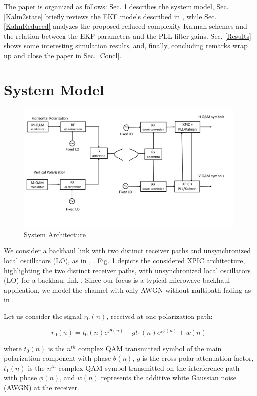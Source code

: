 The paper is organized as follows: Sec. \ref{SM} describes the system model, Sec. \ref{Kalm2state} briefly reviews the EKF models described in \cite{CommLett}, while Sec. \ref{KalmReduced} analyzes the proposed reduced complexity Kalman schemes and the relation between the EKF parameters and the PLL filter gains. 
Sec. \ref{Results} shows some interesting simulation results, and, finally, concluding remarks wrap up and close the paper in Sec. \ref{Concl}.

\section{System Model}
\label{SM}

\begin{figure}
	\centering
	\includegraphics[width=1\textwidth]{figures/fig_red_kalman/Fig1.pdf}
	\caption{System Architecture}
	\label{Fig1}
\end{figure}


We consider a backhaul link with two distinct receiver paths and unsynchronized local oscillators (LO), as in \cite{Rossi}, \cite{CommLett}. Fig. \ref{Fig1} depicts the considered XPIC architecture, highlighting the two distinct receiver paths, with unsynchronized local oscillators (LO) for a backhaul link \cite{Rossi}. Since our focus is a typical microwave backhaul application, we model the channel with only AWGN without multipath fading as in \cite{CommLett}.

Let us consider the signal $r_0(n)$, received at one polarization path:

\begin{equation}
r_0(n)=t_0(n)e^{j\theta(n)}+gt_1(n)e^{j\phi(n)}+w(n)
\label{eq_r0}
\end{equation}

where $t_0(n)$ is the $n^{th}$ complex QAM transmitted symbol of the main polarization component with phase $\theta(n)$, $g$ is the cross-polar attenuation factor, $t_1(n)$ is the $n^{th}$ complex QAM symbol transmitted on the interference path with phase $\phi(n)$, and $w(n)$ represents the additive white Gaussian noise (AWGN) at the receiver.

